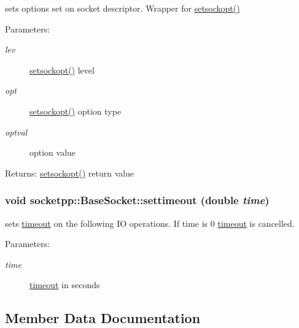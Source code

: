 \begin{CompactItemize}
sets options set on socket descriptor. Wrapper for \hyperlink{classsocketpp_1_1BaseSocket_3f1f168e4953c046bb1159941da2fa30}{setsockopt()} 

\begin{Desc}
\item[Parameters:]
\begin{description}
\item[{\em lev}]\hyperlink{classsocketpp_1_1BaseSocket_3f1f168e4953c046bb1159941da2fa30}{setsockopt()} level \item[{\em opt}]\hyperlink{classsocketpp_1_1BaseSocket_3f1f168e4953c046bb1159941da2fa30}{setsockopt()} option type \item[{\em optval}]option value \end{description}
\end{Desc}
\begin{Desc}
\item[Returns:]\hyperlink{classsocketpp_1_1BaseSocket_3f1f168e4953c046bb1159941da2fa30}{setsockopt()} return value \end{Desc}
\hypertarget{classsocketpp_1_1BaseSocket_0804d148470fd742cda495d3533b25c6}{
\subsubsection[{settimeout}]{\setlength{\rightskip}{0pt plus 5cm}void socketpp::BaseSocket::settimeout (double {\em time})}}
\label{classsocketpp_1_1BaseSocket_0804d148470fd742cda495d3533b25c6}


sets \hyperlink{classsocketpp_1_1timeout}{timeout} on the following IO operations. If time is 0 \hyperlink{classsocketpp_1_1timeout}{timeout} is cancelled. 

\begin{Desc}
\item[Parameters:]
\begin{description}
\item[{\em time}]\hyperlink{classsocketpp_1_1timeout}{timeout} in seconds \end{description}
\end{Desc}


\subsection{Member Data Documentation}
\hypertarget{classsocketpp_1_1BaseSocket_1e44e3c6c2ecd89c2aa716cc62528620}{
}
\end{CompactItemize}
